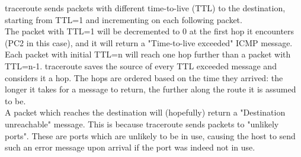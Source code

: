 traceroute sends packets with different time-to-live (TTL) to the destination, starting from TTL=1 and incrementing on each following packet. \\
The packet with TTL=1 will be decremented to 0 at the first hop it encounters (PC2 in this case), and it will return a "Time-to-live exceeded" ICMP message. \\
Each packet with initial TTL=n will reach one hop further than a packet with TTL=n-1. traceroute saves the source of every TTL exceeded message and considers it a hop. The hops are ordered based on the time they arrived: the longer it takes for a message to return, the further along the route it is assumed to be.\\
A packet which reaches the destination will (hopefully) return a "Destination unreachable" message. This is because traceroute sends packets to "unlikely ports". These are ports which are unlikely to be in use, causing the host to send such an error message upon arrival if the port was indeed not in use.
